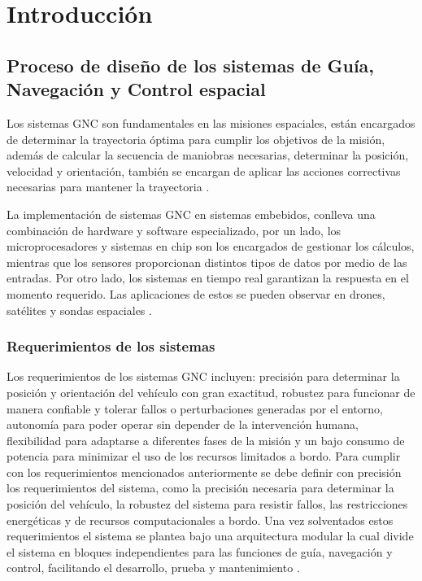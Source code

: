 
\chapter{Introducción}
\label{chp:intro}


\section{Proceso de diseño de los sistemas de Guía, Navegación y Control espacial}

Los sistemas GNC son fundamentales en las misiones espaciales, están encargados de determinar la trayectoria óptima para cumplir los objetivos de la misión, además de calcular la secuencia de maniobras necesarias, determinar la posición, velocidad y orientación, también se encargan de aplicar las acciones correctivas necesarias para mantener la trayectoria \cite{hewing2023enhancing}.

La implementación de sistemas GNC en sistemas embebidos, conlleva una combinación de hardware y software especializado, por un lado, los microprocesadores y sistemas en chip son los encargados de gestionar los cálculos, mientras que los sensores proporcionan distintos tipos de datos por medio de las entradas. Por otro lado, los sistemas en tiempo real garantizan la respuesta en el momento requerido. Las aplicaciones de estos se pueden observar en drones, satélites y sondas espaciales \cite{MathWorks}.

\subsection{Requerimientos de los sistemas}

Los requerimientos de los sistemas GNC incluyen: precisión para determinar la posición y orientación del vehículo con gran exactitud, robustez para funcionar de manera confiable y tolerar fallos o perturbaciones generadas por el entorno, autonomía para poder operar sin depender de la intervención humana, flexibilidad para adaptarse a diferentes fases de la misión y un bajo consumo de potencia para minimizar el uso de los recursos limitados a bordo. 
Para cumplir con los requerimientos mencionados anteriormente se debe definir con precisión los requerimientos del sistema, como la precisión necesaria para determinar la posición del vehículo, la robustez del sistema para resistir fallos, las restricciones energéticas y de recursos computacionales a bordo. Una vez solventados estos requerimientos el sistema se plantea bajo una arquitectura modular la cual divide el sistema en bloques independientes para las funciones de guía, navegación y control, facilitando el desarrollo, prueba y mantenimiento \cite{AEM2017}. 


